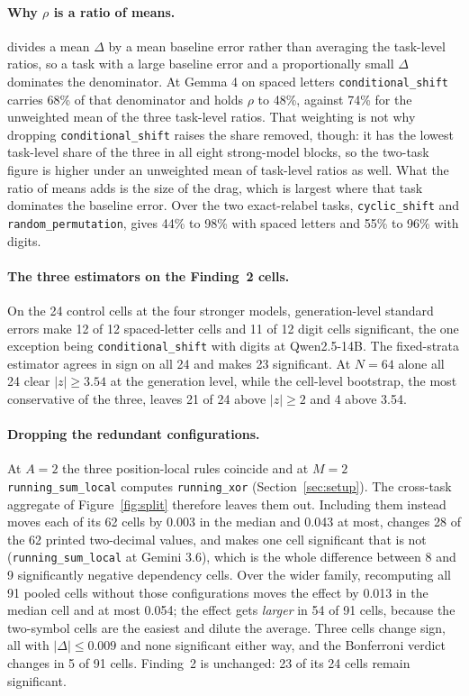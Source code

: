 \documentclass[10pt]{article} %
\newcommand{\task}[1]{\texttt{#1}}
\begin{document}
\paragraph{Why $\rho$ is a ratio of means.}  divides a mean $\Delta$ by a mean baseline error rather than averaging the task-level ratios, so a task with a large baseline error and a proportionally small $\Delta$ dominates the denominator. At Gemma 4 on spaced letters \task{conditional\_shift} carries 68\% of that denominator and holds $\rho$ to 48\%, against 74\% for the unweighted mean of the three task-level ratios. That weighting is not why dropping \task{conditional\_shift} raises the share removed, though: it has the lowest task-level share of the three in all eight strong-model blocks, so the two-task figure is higher under an unweighted mean of task-level ratios as well. What the ratio of means adds is the size of the drag, which is largest where that task dominates the baseline error. Over the two exact-relabel tasks, \task{cyclic\_shift} and \task{random\_permutation},  gives 44\% to 98\% with spaced letters and 55\% to 96\% with digits.

\paragraph{The three estimators on the Finding~2 cells.} On the 24 control cells at the four stronger models, generation-level standard errors make 12 of 12 spaced-letter cells and 11 of 12 digit cells significant, the one exception being \task{conditional\_shift} with digits at Qwen2.5-14B. The fixed-strata estimator agrees in sign on all 24 and makes 23 significant. At $N = 64$ alone all 24 clear $|z| \ge 3.54$ at the generation level, while the cell-level bootstrap, the most conservative of the three, leaves 21 of 24 above $|z| \ge 2$ and 4 above 3.54.

\paragraph{Dropping the redundant configurations.} At $A = 2$ the three position-local rules
coincide and at $M = 2$ \task{running\_sum\_local} computes \task{running\_xor}
(Section~\ref{sec:setup}). The cross-task aggregate of Figure~\ref{fig:split} therefore leaves them out. Including them instead moves each of its 62 cells by 0.003 in the median and 0.043 at most, changes 28 of the 62 printed two-decimal values, and makes one cell significant that is not (\task{running\_sum\_local} at Gemini 3.6), which is the whole difference between 8 and 9 significantly negative dependency cells. Over the wider family, recomputing all 91 pooled cells without those configurations moves
the effect by 0.013 in the median cell and at most 0.054; the effect gets \emph{larger} in 54 of
91 cells, because the two-symbol cells are the easiest and dilute the average. Three cells change
sign, all with $|\Delta| \le 0.009$ and none significant either way, and the Bonferroni verdict
changes in 5 of 91 cells. Finding~2 is unchanged: 23 of its 24 cells remain significant.
\end{document}
